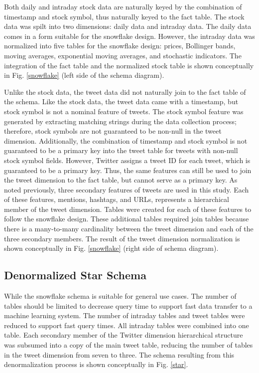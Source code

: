 \documentclass[journal]{IEEEtran}
\begin{document}
Both daily and intraday stock data are naturally keyed by the
 combination of timestamp and stock symbol,
 thus naturally keyed to the fact table.
The stock data was spilt into two dimensions: daily data and intraday data.
The daily data comes in a form suitable for the snowflake design.
However, the intraday data was normalized into five tables for the 
 snowflake design: prices, Bollinger bands, moving averages, exponential
 moving averages, and stochastic indicators.
The integration of the fact table and the normalized stock table is shown
 conceptually in Fig. \ref{snowflake} (left side of the schema diagram).

Unlike the stock data, the tweet data did not naturally join to the fact
 table of the schema.
Like the stock data, the tweet data came with a timestamp, but stock symbol
 is not a nominal feature of tweets.
The stock symbol feature was generated by extracting matching strings
 during the data collection process; therefore, stock symbols are not
 guaranteed to be non-null in the tweet dimension.
Additionally, the combination of timestamp and stock symbol is not guaranteed
 to be a primary key into the tweet table for tweets with non-null stock symbol
 fields.
However, Twitter assigns a tweet ID for each tweet, which is guaranteed to be
 a primary key.
Thus, the same features can still be used to join the tweet dimension to the 
 fact table, but cannot serve as a primary key.
As noted previously, three secondary features of tweets are used in this study.
Each of these features, mentions, hashtags, and URLs, represents a hierarchical
 member of the tweet dimension.
Tables were created for each of these features to follow the snowflake design.
These additional tables required join tables because there is a many-to-many
 cardinality between the tweet dimension and each of the three secondary members.
The result of the tweet dimension normalization is shown conceptually
 in Fig. \ref{snowflake} (right side of schema diagram).

\subsection{Denormalized Star Schema}

While the snowflake schema is suitable for general use cases.
The number of tables should be limited to decrease query time to support
 fast data transfer to a machine learning system.
The number of intraday tables and tweet tables were reduced to support
 fast query times.
All intraday tables were combined into one table. 
Each secondary member of the Twitter dimension hierarchical structure was
 subsumed into a copy of the main tweet table, reducing the number of tables
 in the tweet dimension from seven to three.
The schema resulting from this denormalization process is shown
 conceptually in Fig. \ref{star}.
\end{document}
